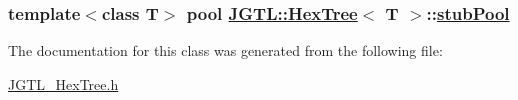 \hypertarget{class_j_g_t_l_1_1_hex_tree_d0e61d442265093fe56a2b60979d7ad3}{
\subsubsection[stubPool]{\setlength{\rightskip}{0pt plus 5cm}template$<$class T$>$ pool \hyperlink{class_j_g_t_l_1_1_hex_tree}{JGTL::Hex\-Tree}$<$ T $>$::\hyperlink{class_j_g_t_l_1_1_hex_tree_d0e61d442265093fe56a2b60979d7ad3}{stub\-Pool}}}
\label{class_j_g_t_l_1_1_hex_tree_d0e61d442265093fe56a2b60979d7ad3}




The documentation for this class was generated from the following file:\begin{CompactItemize}
\item 
\hyperlink{_j_g_t_l___hex_tree_8h}{JGTL\_\-Hex\-Tree.h}\end{CompactItemize}
